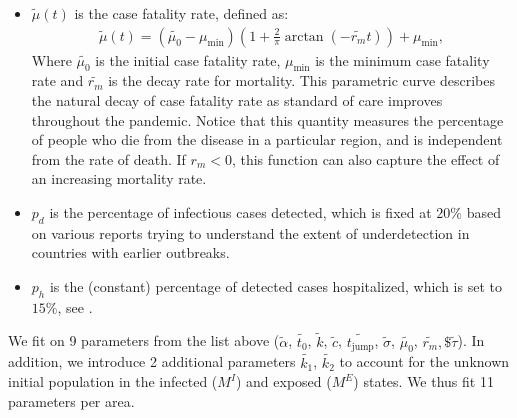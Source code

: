 \documentclass[msom,blindrev]{informs3} %
\begin{document}
\begin{APPENDICES}
\begin{itemize}[topsep=0pt,itemsep=0pt]
    \item $\widetilde{\mu}(t)$ is the case fatality rate, defined as:
    \begin{align*}
        \widetilde{\mu}(t) = \left(\widetilde{\mu_0} - \mu_{\min}\right)\left(1 + \frac{2}{\pi}\arctan\left(-\widetilde{r_m} t\right)\right) + \mu_{\min},
\end{align*}
Where $\widetilde{\mu_0}$ is the initial case fatality rate, $\mu_{\min}$ is the minimum case fatality rate and $\widetilde{r_m}$ is the decay rate for mortality. This parametric curve describes the natural decay of case fatality rate as standard of care improves throughout the pandemic. Notice that this quantity measures the percentage of people who die from the disease in a particular region, and is independent from the rate of death. If $r_m<0$, this function can also capture the effect of an increasing mortality rate. 
    \item $p_d$ is the percentage of infectious cases detected, which is fixed at $20\%$ based on various reports trying to understand the extent of underdetection in countries with earlier outbreaks. 
    \item $p_h$ is the (constant) percentage of detected cases hospitalized, which is set to $15\%$, see .
\end{itemize}

We fit on 9 parameters from the list above ($\widetilde{\alpha}$,  $\widetilde{t_0}$, $\widetilde{k}$, 
 $\widetilde{c}$, $\widetilde{t_\text{jump}}$, $\widetilde{\sigma}$, $\widetilde{\mu_0}$, $\widetilde{r_m}, \$\widetilde{\tau}$). In addition, we introduce 2 additional parameters $\widetilde{k_1}$, $\widetilde{k_2}$ to account for the unknown initial population in the infected ($M^I$) and exposed ($M^E$) states. We thus fit 11 parameters per area.


\end{APPENDICES}
\end{document}

